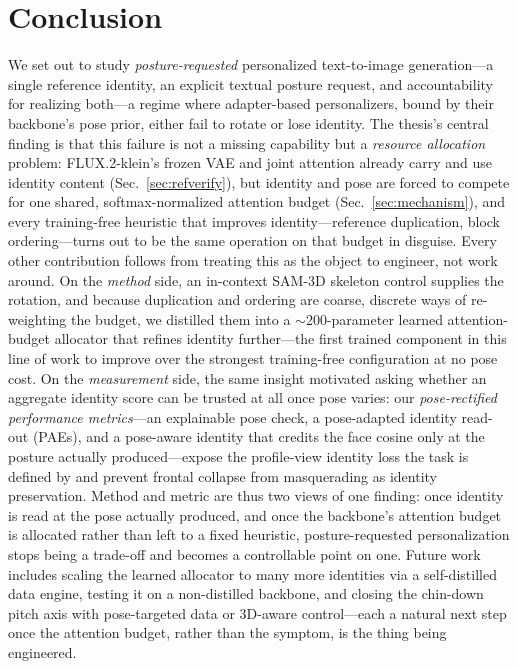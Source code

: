 \chapter*{\prechaptername\space\thechapter\space\postchaptername\hspace{1em}Conclusion}
\label{sec:conclusion}
We set out to study \emph{posture-requested} personalized text-to-image
generation---a single reference identity, an explicit textual posture
request, and accountability for realizing both---a regime where adapter-based
personalizers, bound by their backbone's pose prior, either fail to rotate or
lose identity. The thesis's central finding is that this failure is not a
missing capability but a \emph{resource allocation} problem: FLUX.2-klein's
frozen VAE and joint attention already carry and use identity content
(Sec.~\ref{sec:refverify}), but identity and pose are forced to compete for
one shared, softmax-normalized attention budget (Sec.~\ref{sec:mechanism}),
and every training-free heuristic that improves identity---reference
duplication, block ordering---turns out to be the same operation on that
budget in disguise. Every other contribution follows from treating this as
the object to engineer, not work around. On the \emph{method} side, an
in-context SAM-3D skeleton control supplies the rotation, and because
duplication and ordering are coarse, discrete ways of re-weighting the
budget, we distilled them into a $\sim$200-parameter learned attention-budget
allocator that refines identity further---the first trained component in
this line of work to improve over the strongest training-free configuration
at no pose cost. On the \emph{measurement} side, the same insight motivated
asking whether an aggregate identity score can be trusted at all once pose
varies: our \emph{pose-rectified performance metrics}---an explainable pose
check, a pose-adapted identity read-out (PAEs), and a pose-aware identity
that credits the face cosine only at the posture actually produced---expose
the profile-view identity loss the task is defined by and prevent frontal
collapse from masquerading as identity preservation. Method and metric are
thus two views of one finding: once identity is read at the pose actually
produced, and once the backbone's attention budget is allocated rather than
left to a fixed heuristic, posture-requested personalization stops being a
trade-off and becomes a controllable point on one. Future work includes
scaling the learned allocator to many more identities via a self-distilled
data engine, testing it on a non-distilled backbone, and closing the
chin-down pitch axis with pose-targeted data or 3D-aware control---each a
natural next step once the attention budget, rather than the symptom, is the
thing being engineered.
